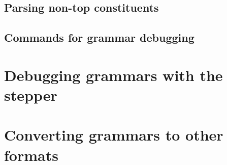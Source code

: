 \subsection{Parsing non-top constituents}
\label{Section:NonTopConstituents}

\subsection{Commands for grammar debugging}
\label{Section:GrammarDebuggingCommands}

\section{Debugging grammars with the stepper}
\label{Section:GrammarDebuggingStepper}

\section{Converting grammars to other formats}
\label{Section:Gemini}

